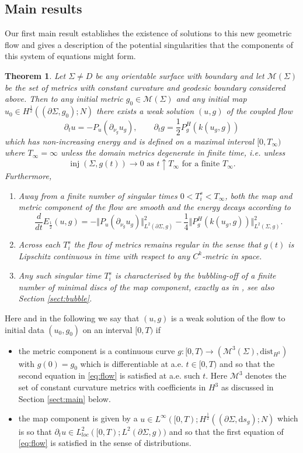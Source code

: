\documentclass[10pt,reqno]{amsart}
\theoremstyle{plain}
\newtheorem{thm}[lemma]{Theorem}
\theoremstyle{definition}
\numberwithin{equation}{section}
\newcommand{\Si}{\Sigma}
\newcommand{\upto}{\uparrow}
\DeclareMathOperator{\inj}{inj}
\newcommand{\norm}[1]{\Vert#1\Vert}
\newcommand{\beq}{\begin{equation}}
\newcommand{\eeq}{\end{equation}}
\newcommand{\half}{\frac{1}{2}}
\newcommand{\dd}{\mathrm{d}} %
\newcommand{\pt}{\partial_t}
\newcommand{\M}{\ensuremath{{\mathcal M}}}
\newcommand{\dist}{\text{dist}}
\newcommand{\pSi}{{\partial \Sigma}}
\newcommand{\MM}{\mathcal{M}} %
\newcommand{\png}{{\partial_{\nu_g}}}
\newcommand{\p}{\partial} %
\begin{document}
\subsection{Main results}
Our first main result establishes the existence of solutions to this new geometric flow and gives a description of the potential singularities that the components of this system of equations might form. 

\begin{thm}\label{thm:1}
    Let $\Si\neq D$ be any orientable surface with boundary and let $\M(\Si)$ be the set of metrics with constant curvature and geodesic boundary considered above. Then to any initial metric $g_0\in \MM(\Si)$ and any initial map $u_0\in H^\half((\pSi,g_0);N)$ there exists a weak solution $(u,g)$ of the coupled flow
    \beq\label{eq:flow}
        \partial_t u =-P_u(\png u_g),\qquad \partial_t g=\half P^H_g(k(u_g,g))
    \eeq
    which has non-increasing energy and is defined on a maximal interval $[0,T_\infty)$ where $T_\infty=\infty$ unless the domain metrics degenerate in finite time, i.e. unless 
    $$\inj(\Si,g(t))\to 0 \text{ as } t\upto T_\infty \text{ for a finite } T_\infty.$$ Furthermore,
    \begin{enumerate}
        \item Away from a finite number of singular times $0<T_i^s<T_\infty$, both the map and metric component of the flow are smooth and the energy decays according to 
        \beq\label{eq:energy-decay}
            \frac{d}{dt}E_{\half}(u,g)=-\norm{P_u(\png u_g)}_{L^2(\pSi,g)}^2-\frac14 \norm{P_g^{H}(k(u_g,g))}_{L^2(\Si,g)}^2.
        \eeq
        \item Across each $T_i^s$ the flow of metrics remains regular in the sense that $g(t)$ is Lip\-schitz continuous in time with respect to any $C^k$-metric in space. 
        \item Any such singular time $T_i^s$ is characterised by the \emph{bubbling-off} of a finite number of minimal discs of the map component, exactly as in \cite{S}, see also  Section \ref{sect:bubble}.
    \end{enumerate}
\end{thm}

Here and in the following we say that $(u,g)$ is a weak solution of the flow to initial data $(u_0,g_0)$ on an interval $[0,T)$ if 
\vspace{-\baselineskip}
\begin{itemize}
    \item the metric component is a continuous curve $g:[0,T)\to (\M^3(\Si),\dist_{H^3})$ with $g(0)=g_0$ which is differentiable at  a.e. $t\in [0,T)$ and so that the second equation in \eqref{eq:flow} is satisfied at a.e. such $t$. Here $\MM^3$ denotes the set of constant curvature metrics with coefficients in $H^3$ as discussed in Section \ref{sect:main} below. 
    \item the map component is given by a $u\in L^\infty([0,T); H^{\half}((\pSi,\dd s_g);N)$ which is so that $\pt u\in L_{loc}^2([0,T);L^2(\p\Si,g))$ and so that  the first equation of \eqref{eq:flow} is satisfied in the sense of distributions.
\end{itemize}
\end{document}
